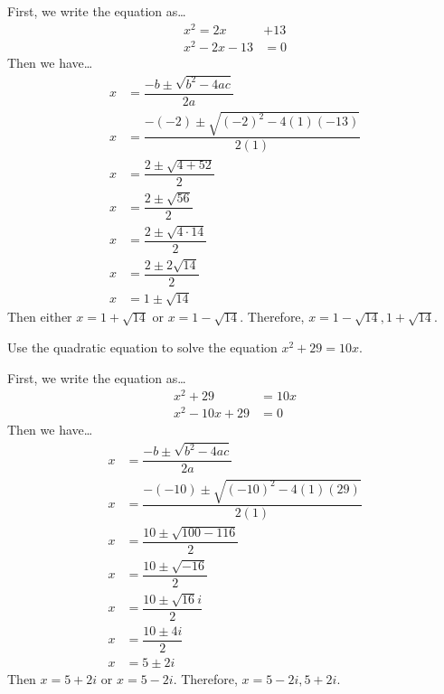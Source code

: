 \documentclass[11pt,letterpaper]{article}
\begin{document}
\sol First, we write the equation as\dots
	\[
	\begin{aligned}
	x^2= 2x &+ 13 \\
	x^2 - 2x - 13&= 0
	\end{aligned}
	\]
Then we have\dots \pspace
	\[
	\begin{aligned}
	x&= \dfrac{-b \pm \sqrt{b^2 - 4ac}}{2a} \\[0.3cm]
	x&= \dfrac{-(-2) \pm \sqrt{(-2)^2 - 4(1)(-13)}}{2(1)} \\[0.3cm]
	x&= \dfrac{2 \pm \sqrt{4 + 52}}{2} \\[0.3cm]
	x&= \dfrac{2 \pm \sqrt{56}}{2} \\[0.3cm]
	x&= \dfrac{2 \pm \sqrt{4 \cdot 14}}{2} \\[0.3cm]
	x&= \dfrac{2 \pm 2\sqrt{14}}{2} \\[0.3cm]
	x&= 1 \pm \sqrt{14}
	\end{aligned}
	\] \pspace
Then either $x= 1 + \sqrt{14}$ or $x= 1 - \sqrt{14}$. Therefore, $x= 1 - \sqrt{14}, 1 + \sqrt{14}$. 



\newpage



 Use the quadratic equation to solve the equation $x^2 + 29= 10x$. \pspace

\sol First, we write the equation as\dots
	\[
	\begin{aligned}
	x^2 + 29&= 10x \\
	x^2 - 10x + 29&= 0 
	\end{aligned}
	\]
Then we have\dots \pspace
	\[
	\begin{aligned}
	x&= \dfrac{-b \pm \sqrt{b^2 - 4ac}}{2a} \\[0.3cm]
	x&= \dfrac{-(-10) \pm \sqrt{(-10)^2 - 4(1)(29)}}{2(1)} \\[0.3cm]
	x&= \dfrac{10 \pm \sqrt{100 - 116}}{2} \\[0.3cm]
	x&= \dfrac{10 \pm \sqrt{-16}}{2} \\[0.3cm]
	x&= \dfrac{10 \pm \sqrt{16}i}{2} \\[0.3cm]
	x&= \dfrac{10 \pm 4i}{2} \\[0.3cm]
	x&= 5 \pm 2i
	\end{aligned}
	\] \pspace
Then $x= 5 + 2i$ or $x= 5 - 2i$. Therefore, $x= 5 - 2i, 5 + 2i$. 
\end{document}
